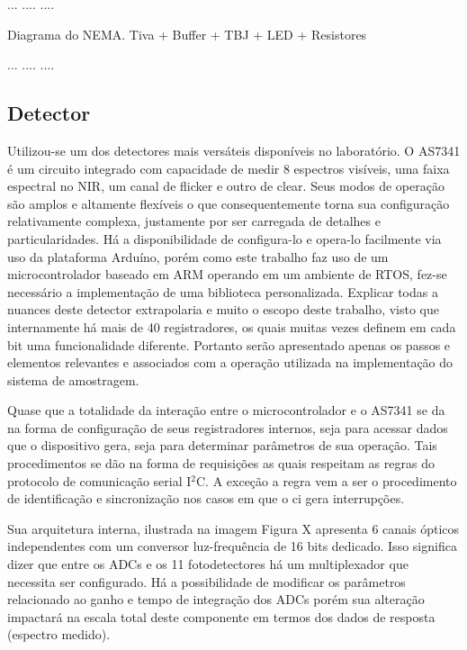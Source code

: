 \documentclass[oneside,openright,12pt]{ufsm_2021} %
\begin{document}
            \par ...    ....    ....
            \par Diagrama do NEMA. Tiva + Buffer + TBJ + LED + Resistores
            \par ...    ....    ....    
            
        \subsection{Detector}
        \label{sub:DetectorVis}
            \par Utilizou-se um dos detectores mais versáteis disponíveis no laboratório. O AS7341 é um circuito integrado com capacidade de medir 8 espectros visíveis, uma faixa espectral no NIR, um canal de flicker e outro de clear. Seus modos de operação são amplos \cite{data:DataAS7341} e altamente flexíveis o que consequentemente torna sua configuração relativamente complexa, justamente por ser carregada de detalhes e particularidades. Há a disponibilidade de configura-lo e opera-lo facilmente via uso da plataforma Arduíno, porém como este trabalho faz uso de um microcontrolador baseado em ARM operando em um ambiente de RTOS, fez-se necessário a implementação de uma biblioteca personalizada. Explicar todas a nuances deste detector extrapolaria e muito o escopo deste trabalho, visto que internamente há mais de 40 registradores, os quais muitas vezes definem em cada bit uma funcionalidade diferente. Portanto serão apresentado apenas os passos e elementos relevantes e associados com a operação utilizada na implementação do sistema de amostragem. 
            
            \par Quase que a totalidade da interação entre o microcontrolador e o AS7341 se da na forma de configuração de seus registradores internos, seja para acessar dados que o dispositivo gera, seja para determinar parâmetros de sua operação. Tais procedimentos se dão na forma de requisições as quais respeitam as regras do protocolo de comunicação serial I$^2$C. A exceção a regra vem a ser o procedimento de identificação e sincronização nos casos em que o ci gera interrupções. 
            
            \par Sua arquitetura interna, ilustrada na imagem Figura X apresenta 6 canais ópticos independentes \cite{data:DataAS7341} com um conversor luz-frequência de 16 bits dedicado. Isso significa dizer que entre os ADCs e os  11 fotodetectores há um multiplexador que necessita ser configurado. Há a possibilidade de modificar os parâmetros relacionado ao ganho e tempo de integração dos ADCs porém sua alteração impactará na escala total deste componente em termos dos dados de resposta (espectro medido).
\end{document}

